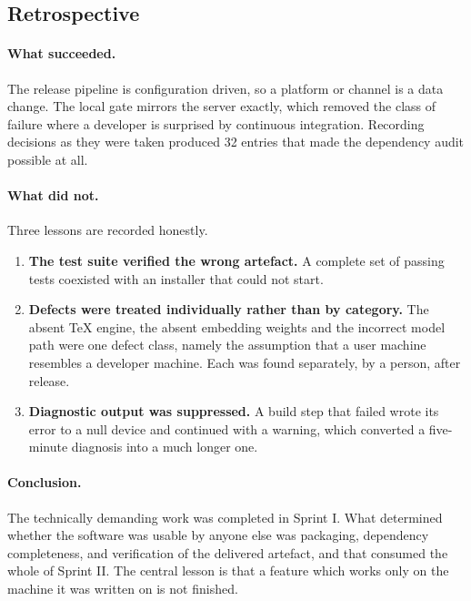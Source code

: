 \documentclass[11pt,a4paper]{article}
\begin{document}
\subsection{Retrospective}

\paragraph{What succeeded.} The release pipeline is configuration driven, so a
platform or channel is a data change. The local gate mirrors the server exactly,
which removed the class of failure where a developer is surprised by continuous
integration. Recording decisions as they were taken produced 32 entries that
made the dependency audit possible at all.

\paragraph{What did not.} Three lessons are recorded honestly.

\begin{enumerate}[leftmargin=*]
  \item \textbf{The test suite verified the wrong artefact.} A complete set of
        passing tests coexisted with an installer that could not start.
  \item \textbf{Defects were treated individually rather than by category.} The
        absent TeX engine, the absent embedding weights and the incorrect model
        path were one defect class, namely the assumption that a user machine
        resembles a developer machine. Each was found separately, by a person,
        after release.
  \item \textbf{Diagnostic output was suppressed.} A build step that failed
        wrote its error to a null device and continued with a warning, which
        converted a five-minute diagnosis into a much longer one.
\end{enumerate}

\paragraph{Conclusion.} The technically demanding work was completed in Sprint I.
What determined whether the software was usable by anyone else was packaging,
dependency completeness, and verification of the delivered artefact, and that
consumed the whole of Sprint II. The central lesson is that a feature which
works only on the machine it was written on is not finished.
\end{document}
